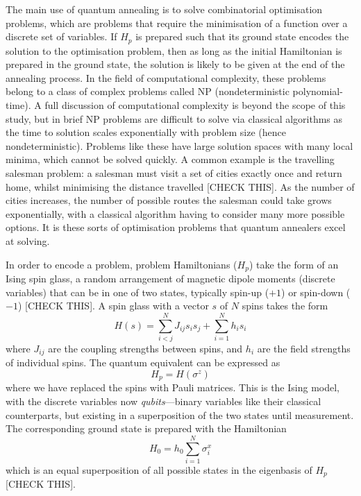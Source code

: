 \documentclass[12pt]{article}
\theoremstyle{definition}
\begin{document}
The main use of quantum annealing is to solve combinatorial optimisation problems, which are problems that require the minimisation of a function over a discrete set of variables. If $H_p$ is prepared such that its ground state encodes the solution to the optimisation problem, then as long as the initial Hamiltonian is prepared in the ground state, the solution is likely to be given at the end of the annealing process. In the field of computational complexity, these problems belong to a class of complex problems called NP (nondeterministic polynomial-time). A full discussion of computational complexity is beyond the scope of this study, but in brief NP problems are difficult to solve via classical algorithms as the time to solution scales exponentially with problem size (hence nondeterministic). Problems like these have large solution spaces with many local minima, which cannot be solved quickly. A common example is the travelling salesman problem: a salesman must visit a set of cities exactly once and return home, whilst minimising the distance travelled [CHECK THIS]. As the number of cities increases, the number of possible routes the salesman could take grows exponentially, with a classical algorithm having to consider many more possible options. It is these sorts of optimisation problems that quantum annealers excel at solving.

In order to encode a problem, problem Hamiltonians ($H_p$) take the form of an Ising spin glass, a random arrangement of magnetic dipole moments (discrete variables) that can be in one of two states, typically spin-up ($+1$) or spin-down ($-1$) [CHECK THIS]. A spin glass with a vector $s$ of $N$ spins takes the form
\begin{equation}
    H(s) = \sum_{i<j}^{N}J_{ij}s_i s_j + \sum_{i=1}^{N}h_i s_i
    \label{eq:ising}
\end{equation}
where $J_{ij}$ are the coupling strengths between spins, and $h_i$ are the field strengths of individual spins. The quantum equivalent can be expressed as
\begin{equation}
    H_p = H(\sigma^z)
\end{equation}
where we have replaced the spins with Pauli matrices. This is the Ising model, with the discrete variables now \emph{qubits}---binary variables like their classical counterparts, but existing in a superposition of the two states until measurement. The corresponding ground state is prepared with the Hamiltonian
\begin{equation}
    H_0 = h_0\sum_{i=1}^{N}\sigma_i^x
\end{equation}
which is an equal superposition of all possible states in the eigenbasis of $H_p$ [CHECK THIS].
\end{document}
